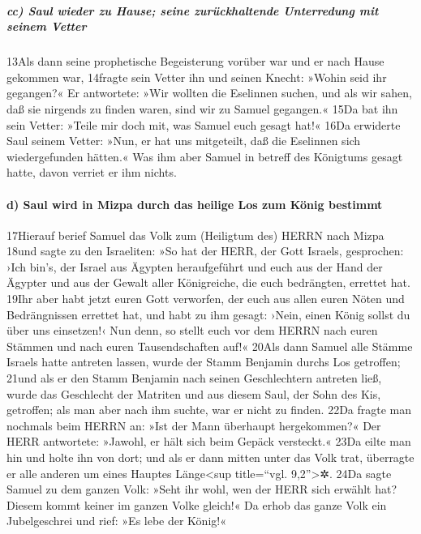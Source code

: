 \hypertarget{cc-saul-wieder-zu-hause-seine-zuruxfcckhaltende-unterredung-mit-seinem-vetter}{%
\subparagraph{cc) Saul wieder zu Hause; seine zurückhaltende Unterredung
mit seinem
Vetter}\label{cc-saul-wieder-zu-hause-seine-zuruxfcckhaltende-unterredung-mit-seinem-vetter}}

13Als dann seine prophetische Begeisterung vorüber war und er nach Hause
gekommen war, 14fragte sein Vetter ihn und seinen Knecht: »Wohin seid
ihr gegangen?« Er antwortete: »Wir wollten die Eselinnen suchen, und als
wir sahen, daß sie nirgends zu finden waren, sind wir zu Samuel
gegangen.« 15Da bat ihn sein Vetter: »Teile mir doch mit, was Samuel
euch gesagt hat!« 16Da erwiderte Saul seinem Vetter: »Nun, er hat uns
mitgeteilt, daß die Eselinnen sich wiedergefunden hätten.« Was ihm aber
Samuel in betreff des Königtums gesagt hatte, davon verriet er ihm
nichts.

\hypertarget{d-saul-wird-in-mizpa-durch-das-heilige-los-zum-kuxf6nig-bestimmt}{%
\paragraph{d) Saul wird in Mizpa durch das heilige Los zum König
bestimmt}\label{d-saul-wird-in-mizpa-durch-das-heilige-los-zum-kuxf6nig-bestimmt}}

17Hierauf berief Samuel das Volk zum (Heiligtum des) HERRN nach Mizpa
18und sagte zu den Israeliten: »So hat der HERR, der Gott Israels,
gesprochen: ›Ich bin's, der Israel aus Ägypten heraufgeführt und euch
aus der Hand der Ägypter und aus der Gewalt aller Königreiche, die euch
bedrängten, errettet hat. 19Ihr aber habt jetzt euren Gott verworfen,
der euch aus allen euren Nöten und Bedrängnissen errettet hat, und habt
zu ihm gesagt: ›Nein, einen König sollst du über uns einsetzen!‹ Nun
denn, so stellt euch vor dem HERRN nach euren Stämmen und nach euren
Tausendschaften auf!« 20Als dann Samuel alle Stämme Israels hatte
antreten lassen, wurde der Stamm Benjamin durchs Los getroffen; 21und
als er den Stamm Benjamin nach seinen Geschlechtern antreten ließ, wurde
das Geschlecht der Matriten und aus diesem Saul, der Sohn des Kis,
getroffen; als man aber nach ihm suchte, war er nicht zu finden. 22Da
fragte man nochmals beim HERRN an: »Ist der Mann überhaupt hergekommen?«
Der HERR antwortete: »Jawohl, er hält sich beim Gepäck versteckt.« 23Da
eilte man hin und holte ihn von dort; und als er dann mitten unter das
Volk trat, überragte er alle anderen um eines Hauptes Länge\textless sup
title=``vgl. 9,2''\textgreater✲. 24Da sagte Samuel zu dem ganzen Volk:
»Seht ihr wohl, wen der HERR sich erwählt hat? Diesem kommt keiner im
ganzen Volke gleich!« Da erhob das ganze Volk ein Jubelgeschrei und
rief: »Es lebe der König!«

